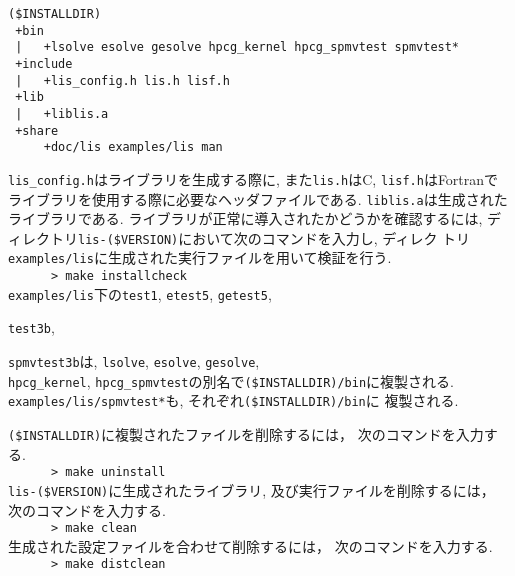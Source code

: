 \documentclass[a4paper]{jarticle}
\begin{document}
\begin{verbatim}
($INSTALLDIR)
 +bin
 |   +lsolve esolve gesolve hpcg_kernel hpcg_spmvtest spmvtest*
 +include
 |   +lis_config.h lis.h lisf.h
 +lib
 |   +liblis.a
 +share
     +doc/lis examples/lis man
\end{verbatim}
{\tt lis\_config.h}はライブラリを生成する際に, また{\tt lis.h}はC, {\tt lisf.h}はFortranで
ライブラリを使用する際に必要なヘッダファイルである. {\tt liblis.a}は生成された
ライブラリである. 
ライブラリが正常に導入されたかどうかを確認するには, 
ディレクトリ{\tt lis-(\$VERSION)}において次のコマンドを入力し, ディレク
トリ{\tt examples/lis}に生成された実行ファイルを用いて検証を行う. \\
 \verb+      > make installcheck+ \\
{\tt examples/lis}下の{\tt test1}, {\tt etest5}, {\tt getest5}, 
{{\tt test3b}, {{\tt spmvtest3b}は, 
{\tt lsolve}, {\tt esolve}, {\tt gesolve},\\ 
{\tt hpcg\_kernel}, {\tt hpcg\_spmvtest}の別名で{\tt (\$INSTALLDIR)/bin}に複製される.
{\tt examples/lis/spmvtest*}も, それぞれ{\tt (\$INSTALLDIR)/bin}に
複製される.

{\tt (\$INSTALLDIR)}に複製されたファイルを削除するには，
次のコマンドを入力する. \\
 \verb+      > make uninstall+\\
{\tt lis-(\$VERSION)}に生成されたライブラリ, 及び実行ファイルを削除するには，
次のコマンドを入力する. \\
 \verb+      > make clean+\\
生成された設定ファイルを合わせて削除するには，
次のコマンドを入力する. \\
 \verb+      > make distclean+

}}
\end{document}
